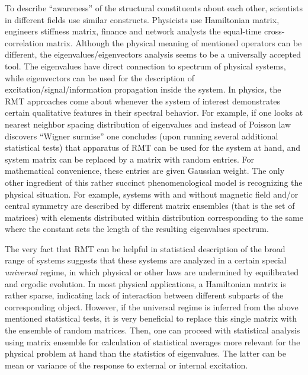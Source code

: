 \documentclass{IEEEtran}
\begin{document}
To describe {}``awareness'' of the structural constituents about
each other, scientists in different fields use similar constructs.
Physicists use Hamiltonian matrix, engineers stiffness matrix, finance
and network analysts the equal-time cross-correlation matrix. Although
the physical meaning of mentioned operators can be different, the
eigenvalues/eigenvectors analysis seems to be a universally accepted
tool. The eigenvalues have direct connection to spectrum of physical
systems, while eigenvectors can be used for the description of excitation/signal/information
propagation inside the system. In physics, the RMT approaches come
about whenever the system of interest demonstrates certain qualitative
features in their spectral behavior. For example, if one looks at
nearest neighbor spacing distribution of eigenvalues and instead of
Poisson law
 discovers {}``Wigner surmise''
one concludes (upon running several additional statistical tests)
that apparatus of RMT can be used for the system at hand, and system
matrix can be replaced by a matrix with random entries. For mathematical
convenience, these entries are given Gaussian weight. The only other
ingredient of this rather succinct phenomenological model is recognizing
the physical situation. For example, systems with and without magnetic
field and/or central symmetry are described by different matrix ensembles
(that is the set of matrices) with elements distributed within distribution
corresponding to the same 
where the constant  sets the length of the resulting eigenvalues
spectrum.

The very fact that RMT can be helpful in statistical description of
the broad range of systems suggests that these systems are analyzed
in a certain special \emph{universal} regime, in which physical or
other laws are undermined by equilibrated and ergodic evolution. In
most physical applications, a Hamiltonian matrix is rather sparse,
indicating lack of interaction between different subparts of the corresponding
object. However, if the universal regime is inferred from the above
mentioned statistical tests, it is very beneficial to replace this
single matrix with the ensemble of random matrices. Then, one can
proceed with statistical analysis using matrix ensemble for calculation
of statistical averages more relevant for the physical problem at
hand than the statistics of eigenvalues. The latter can be mean or
variance of the response to external or internal excitation.
\end{document}
